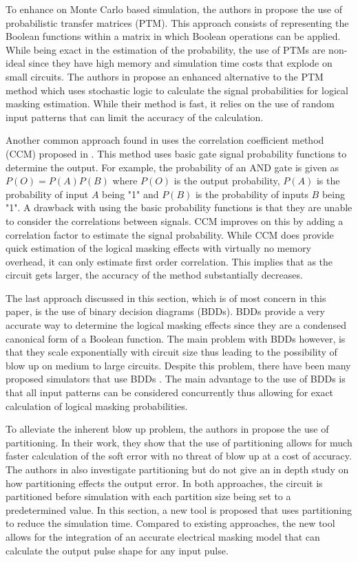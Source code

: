 To enhance on Monte Carlo based simulation, the authors in \cite{PTM} propose the use of probabilistic transfer matrices (PTM). This approach consists of representing the Boolean functions within a matrix in which Boolean operations can be applied. While being exact in the estimation of the probability, the use of PTMs are non-ideal since they have high memory and simulation time costs that explode on small circuits. The authors in \cite{Han2014} propose an enhanced alternative to the PTM method which uses stochastic logic to calculate the signal probabilities for logical masking estimation. While their method is fast, it relies on the use of random input patterns that can limit the accuracy of the calculation.

Another common approach found in \cite{Chen2013,Li2016} uses the correlation coefficient method (CCM) proposed in \cite{Ercolani1989}. This method uses basic gate signal probability functions to determine the output. For example, the probability of an AND gate is given as $P(O) = P(A)P(B)$ where $P(O)$ is the output probability, $P(A)$ is the probability of input $A$ being "1" and $P(B)$ is the probability of inputs $B$ being "1". A drawback with using the basic probability functions is that they are unable to consider the correlations between signals. CCM improves on this by adding a correlation factor to estimate the signal probability. While CCM does provide quick estimation of the logical masking effects with virtually no memory overhead, it can only estimate first order correlation. This implies that as the circuit gets larger, the accuracy of the method substantially decreases.

The last approach discussed in this section, which is of most concern in this paper, is the use of binary decision diagrams (BDDs). BDDs provide a very accurate way to determine the logical masking effects since they are a condensed canonical form of a Boolean function. The main problem with BDDs however, is that they scale exponentially with circuit size thus leading to the possibility of blow up on medium to large circuits. Despite this problem, there have been many proposed simulators that use BDDs \cite{FASER,MARS_C,METSys}. The main advantage to the use of BDDs is that all input patterns can be considered concurrently thus allowing for exact calculation of logical masking probabilities.

To alleviate the inherent blow up problem, the authors in \cite{FASER} propose the use of partitioning. In their work, they show that the use of partitioning allows for much faster calculation of the soft error with no threat of blow up at a cost of accuracy. The authors in \cite{METSys} also investigate partitioning but do not give an in depth study on how partitioning effects the output error. In both approaches, the circuit is partitioned before simulation with each partition size being set to a predetermined value. In this section, a new tool is proposed that uses partitioning to reduce the simulation time. Compared to existing approaches, the new tool allows for the integration of an accurate electrical masking model that can calculate the output pulse shape for any input pulse.

